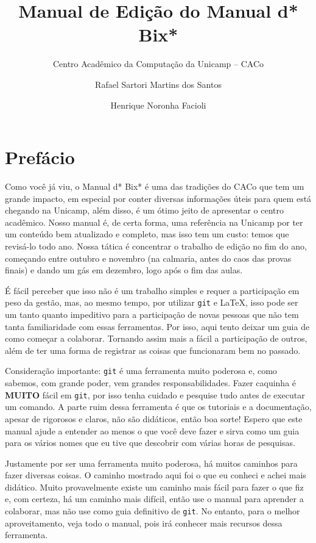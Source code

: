 \documentclass[a4paper,oneside,10pt]{memoir}
\title{Manual de Edição do Manual d* Bix*}
\author{
  Centro Acadêmico da Computação da Unicamp -- CACo
  \and
  Rafael Sartori Martins dos Santos
  \and
  Henrique Noronha Facioli
}
\date{\the\year}
\begin{document}
\maketitle

\frontmatter
\tableofcontents

\chapter{Prefácio}

Como você já viu, o Manual d* Bix* é uma das tradições do CACo que tem um
grande impacto, em especial por conter diversas informações úteis para quem
está chegando na Unicamp, além disso, é um ótimo jeito de apresentar o centro
acadêmico. Nosso manual é, de certa forma, uma referência na Unicamp por ter um
conteúdo bem atualizado e completo, mas isso tem um custo: temos que revisá-lo
todo ano. Nossa tática é concentrar o trabalho de edição no fim do ano,
começando entre outubro e novembro (na calmaria, antes do caos das provas
finais) e dando um gás em dezembro, logo após o fim das aulas.

É fácil perceber que isso não é um trabalho simples e requer a participação em
peso da gestão, mas, ao mesmo tempo, por utilizar \texttt{git} e \LaTeX, isso
pode ser um tanto quanto impeditivo para a participação de novas pessoas que
não tem tanta familiaridade com essas ferramentas. Por isso, aqui tento deixar
um guia de como começar a colaborar. Tornando assim mais a fácil a participação
de outros, além de ter uma forma de registrar as coisas que funcionaram bem no
passado.

Consideração importante: \texttt{git} é uma ferramenta muito poderosa e, como
sabemos, com grande poder, vem grandes responsabilidades. Fazer caquinha é
\textbf{MUITO} fácil em \texttt{git}, por isso tenha cuidado e pesquise tudo
antes de executar um comando. A parte ruim dessa ferramenta é que os tutoriais
e a documentação, apesar de rigorosos e claros, não são didáticos, então boa
sorte! Espero que este manual ajude a entender ao menos o que você deve fazer e
sirva como um guia para os vários nomes que eu tive que descobrir com várias
horas de pesquisas.

Justamente por ser uma ferramenta muito poderosa, há muitos caminhos para fazer
diversas coisas. O caminho mostrado aqui foi o que eu conheci e achei mais
didático. Muito provavelmente existe um caminho mais fácil para fazer o que fiz
e, com certeza, há um caminho mais difícil, então use o manual para aprender a
colaborar, mas não use como guia definitivo de \texttt{git}. No entanto, para o
melhor aproveitamento, veja todo o manual, pois irá conhecer mais recursos dessa
ferramenta.
\end{document}
